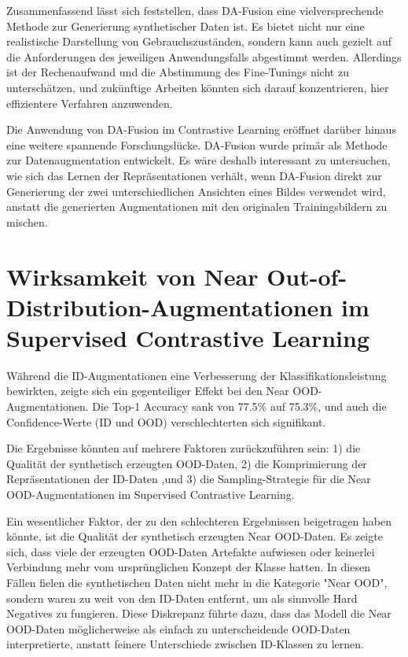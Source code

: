 Zusammenfassend lässt sich feststellen, dass DA-Fusion eine vielversprechende Methode zur Generierung synthetischer Daten ist. Es bietet nicht nur eine realistische Darstellung von Gebrauchszuständen, sondern kann auch gezielt auf die Anforderungen des jeweiligen Anwendungsfalls abgestimmt werden. Allerdings ist der Rechenaufwand und die Abstimmung des Fine-Tunings nicht zu unterschätzen, und zukünftige Arbeiten könnten sich darauf konzentrieren, hier effizientere Verfahren anzuwenden.

Die Anwendung von DA-Fusion im Contrastive Learning eröffnet darüber hinaus eine weitere spannende Forschungslücke. DA-Fusion wurde primär als Methode zur Datenaugmentation entwickelt. Es wäre deshalb interessant zu untersuchen, wie sich das Lernen der Repräsentationen verhält, wenn DA-Fusion direkt zur Generierung der zwei unterschiedlichen Ansichten eines Bildes verwendet wird, anstatt die generierten Augmentationen mit den originalen Trainingsbildern zu mischen.

\section{Wirksamkeit von Near Out-of-Distribution-Augmentationen im Supervised Contrastive Learning} \label{sec:ood-discussion}

Während die ID-Augmentationen eine Verbesserung der Klassifikationsleistung bewirkten, zeigte sich ein gegenteiliger Effekt bei den Near OOD-Augmentationen. Die Top-1 Accuracy sank von 77.5\% auf 75.3\%, und auch die Confidence-Werte (ID und OOD) verschlechterten sich signifikant.

Die Ergebnisse könnten auf mehrere Faktoren zurückzuführen sein: 1) die Qualität der synthetisch erzeugten OOD-Daten, 2) die Komprimierung der Repräsentationen der ID-Daten ,und 3) die Sampling-Strategie für die Near OOD-Augmentationen im Supervised Contrastive Learning.

Ein wesentlicher Faktor, der zu den schlechteren Ergebnissen beigetragen haben könnte, ist die Qualität der synthetisch erzeugten Near OOD-Daten. Es zeigte sich, dass viele der erzeugten OOD-Daten Artefakte aufwiesen oder keinerlei Verbindung mehr vom ursprünglichen Konzept der Klasse hatten. In diesen Fällen fielen die synthetischen Daten nicht mehr in die Kategorie "Near OOD", sondern waren zu weit von den ID-Daten entfernt, um als sinnvolle Hard Negatives zu fungieren. Diese Diskrepanz führte dazu, dass das Modell die Near OOD-Daten möglicherweise als einfach zu unterscheidende OOD-Daten interpretierte, anstatt feinere Unterschiede zwischen ID-Klassen zu lernen.

